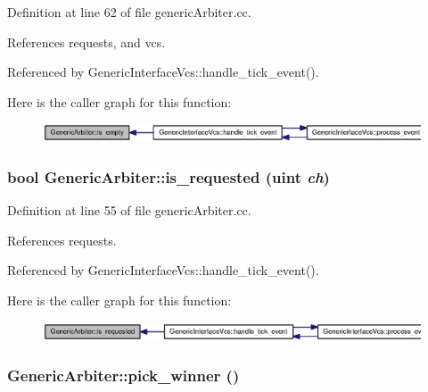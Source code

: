 Definition at line 62 of file genericArbiter.cc.

References requests, and vcs.

Referenced by GenericInterfaceVcs::handle\_\-tick\_\-event().

Here is the caller graph for this function:\nopagebreak
\begin{figure}[H]
\begin{center}
\leavevmode
\includegraphics[width=417pt]{classGenericArbiter_334fbdb8fc6071936b0d05a5778cc714_icgraph}
\end{center}
\end{figure}
\subsubsection[{is\_\-requested}]{\setlength{\rightskip}{0pt plus 5cm}bool GenericArbiter::is\_\-requested ({\bf uint} {\em ch})}\label{classGenericArbiter_6cb1ab1819bd58fc51935af5af5bd6d5}




Definition at line 55 of file genericArbiter.cc.

References requests.

Referenced by GenericInterfaceVcs::handle\_\-tick\_\-event().

Here is the caller graph for this function:\nopagebreak
\begin{figure}[H]
\begin{center}
\leavevmode
\includegraphics[width=420pt]{classGenericArbiter_6cb1ab1819bd58fc51935af5af5bd6d5_icgraph}
\end{center}
\end{figure}
\subsubsection[{pick\_\-winner}]{ GenericArbiter::pick\_\-winner ()}\label{classGenericArbiter_4a5b38f3d16471a75c0c35fc1ecb3031}




